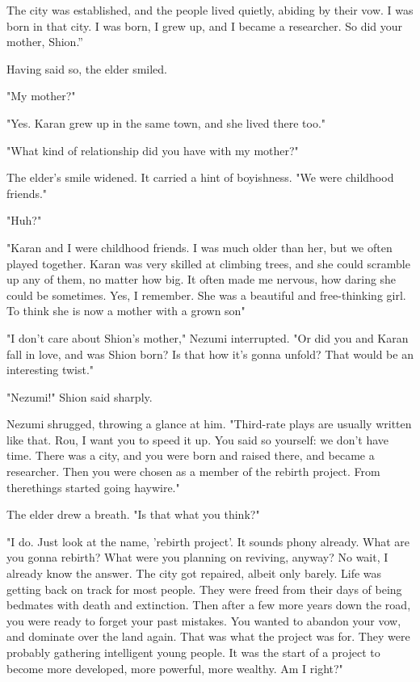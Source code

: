 The city was established, and the people lived quietly, abiding by their
vow. I was born in that city. I was born, I grew up, and I became a
researcher. So did your mother, Shion.''

Having said so, the elder smiled.

"My mother?"

"Yes. Karan grew up in the same town, and she lived there too."

"What kind of relationship did you have with my mother?"

The elder's smile widened. It carried a hint of boyishness. "We were
childhood friends."

"Huh?"

"Karan and I were childhood friends. I was much older than her, but we
often played together. Karan was very skilled at climbing trees, and she
could scramble up any of them, no matter how big. It often made me
nervous, how daring she could be sometimes. Yes, I remember. She was a
beautiful and free-thinking girl. To think she is now a mother with a
grown son\el "

"I don't care about Shion's mother," Nezumi interrupted. "Or did you and
Karan fall in love, and was Shion born? Is that how it's gonna unfold?
That would be an interesting twist."

"Nezumi!" Shion said sharply.

Nezumi shrugged, throwing a glance at him. "Third-rate plays are usually
written like that. Rou, I want you to speed it up. You said so yourself:
we don't have time. There was a city, and you were born and raised
there, and became a researcher. Then you were chosen as a member of the
rebirth project. From there\el things started going haywire."

The elder drew a breath. "Is that what you think?"

"I do. Just look at the name, 'rebirth project'. It sounds phony
already. What are you gonna rebirth? What were you planning on reviving,
anyway? No wait, I already know the answer. The city got repaired,
albeit only barely. Life was getting back on track for most people. They
were freed from their days of being bedmates with death and extinction.
Then after a few more years down the road, you were ready to forget your
past mistakes. You wanted to abandon your vow, and dominate over the
land again. That was what the project was for. They were probably
gathering intelligent young people. It was the start of a project to
become more developed, more powerful, more wealthy. Am I right?"

